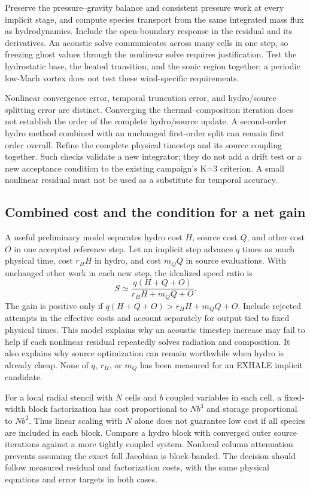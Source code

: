 \documentclass[english,a4paper]{my_memo}
\begin{document}
Preserve the pressure--gravity balance and consistent pressure work at every implicit stage, and compute species transport from the same integrated mass flux as hydrodynamics. Include the open-boundary response in the residual and its derivatives. An acoustic solve communicates across many cells in one step, so freezing ghost values through the nonlinear solve requires justification. Test the hydrostatic base, the heated transition, and the sonic region together; a periodic low-Mach vortex does not test these wind-specific requirements.

Nonlinear convergence error, temporal truncation error, and hydro/source splitting error are distinct. Converging the thermal--composition iteration does not establish the order of the complete hydro/source update. A second-order hydro method combined with an unchanged first-order split can remain first order overall. Refine the complete physical timestep and its source coupling together. Such checks validate a new integrator; they do not add a drift test or a new acceptance condition to the existing campaign's K=3 criterion. A small nonlinear residual must not be used as a substitute for temporal accuracy.

\subsection{Combined cost and the condition for a net gain}
A useful preliminary model separates hydro cost $H$, source cost $Q$, and other cost $O$ in one accepted reference step. Let an implicit step advance $q$ times as much physical time, cost $r_H H$ in hydro, and cost $m_Q Q$ in source evaluations. With unchanged other work in each new step, the idealized speed ratio is
\begin{equation}
 S\simeq\frac{q(H+Q+O)}{r_H H+m_Q Q+O}.
\end{equation}
The gain is positive only if $q(H+Q+O)>r_H H+m_Q Q+O$. Include rejected attempts in the effective costs and account separately for output tied to fixed physical times. This model explains why an acoustic timestep increase may fail to help if each nonlinear residual repeatedly solves radiation and composition. It also explains why source optimization can remain worthwhile when hydro is already cheap. None of $q$, $r_H$, or $m_Q$ has been measured for an EXHALE implicit candidate.

For a local radial stencil with $N$ cells and $b$ coupled variables in each cell, a fixed-width block factorization has cost proportional to $Nb^3$ and storage proportional to $Nb^2$. Thus linear scaling with $N$ alone does not guarantee low cost if all species are included in each block. Compare a hydro block with converged outer source iterations against a more tightly coupled system. Nonlocal column attenuation prevents assuming the exact full Jacobian is block-banded. The decision should follow measured residual and factorization costs, with the same physical equations and error targets in both cases.
\end{document}
